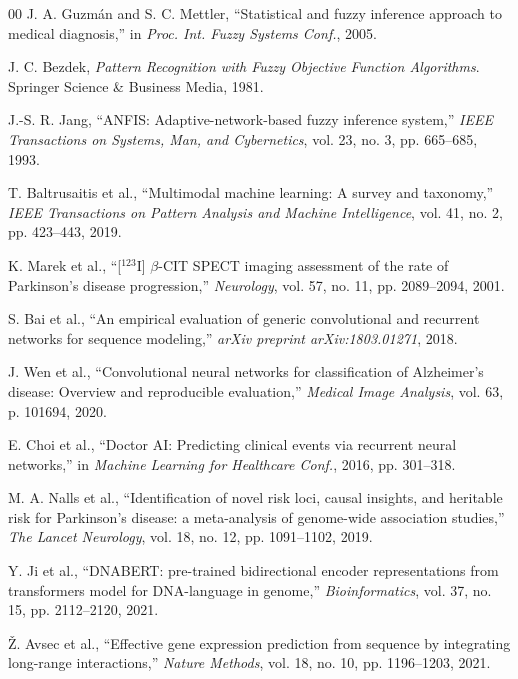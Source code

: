 \documentclass[journal,twoside,web]{ieeecolor}
\begin{document}
\begin{thebibliography}{00}
J. A. Guzm\'{a}n and S. C. Mettler, ``Statistical and fuzzy inference approach to medical diagnosis,'' in \textit{Proc. Int. Fuzzy Systems Conf.}, 2005.

J. C. Bezdek, \textit{Pattern Recognition with Fuzzy Objective Function Algorithms}. Springer Science \& Business Media, 1981.

J.-S. R. Jang, ``ANFIS: Adaptive-network-based fuzzy inference system,'' \textit{IEEE Transactions on Systems, Man, and Cybernetics}, vol. 23, no. 3, pp. 665--685, 1993.

T. Baltrusaitis et al., ``Multimodal machine learning: A survey and taxonomy,'' \textit{IEEE Transactions on Pattern Analysis and Machine Intelligence}, vol. 41, no. 2, pp. 423--443, 2019.

K. Marek et al., ``[$^{123}$I] $\beta$-CIT SPECT imaging assessment of the rate of Parkinson's disease progression,'' \textit{Neurology}, vol. 57, no. 11, pp. 2089--2094, 2001.

S. Bai et al., ``An empirical evaluation of generic convolutional and recurrent networks for sequence modeling,'' \textit{arXiv preprint arXiv:1803.01271}, 2018.

J. Wen et al., ``Convolutional neural networks for classification of Alzheimer's disease: Overview and reproducible evaluation,'' \textit{Medical Image Analysis}, vol. 63, p. 101694, 2020.

E. Choi et al., ``Doctor AI: Predicting clinical events via recurrent neural networks,'' in \textit{Machine Learning for Healthcare Conf.}, 2016, pp. 301--318.

M. A. Nalls et al., ``Identification of novel risk loci, causal insights, and heritable risk for Parkinson's disease: a meta-analysis of genome-wide association studies,'' \textit{The Lancet Neurology}, vol. 18, no. 12, pp. 1091--1102, 2019.

Y. Ji et al., ``DNABERT: pre-trained bidirectional encoder representations from transformers model for DNA-language in genome,'' \textit{Bioinformatics}, vol. 37, no. 15, pp. 2112--2120, 2021.

\v{Z}. Avsec et al., ``Effective gene expression prediction from sequence by integrating long-range interactions,'' \textit{Nature Methods}, vol. 18, no. 10, pp. 1196--1203, 2021.


\end{thebibliography}
\end{document}
